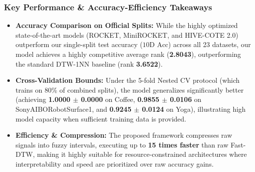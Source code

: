 \documentclass[conference]{IEEEtran}
\begin{document}
\subsubsection{Key Performance \& Accuracy-Efficiency Takeaways}
\begin{itemize}
    \item \textbf{Accuracy Comparison on Official Splits:} While the highly optimized state-of-the-art models (ROCKET, MiniROCKET, and HIVE-COTE 2.0) outperform our single-split test accuracy ($10\text{D Acc}$) across all 23 datasets, our model achieves a highly competitive average rank (\textbf{2.8043}), outperforming the standard DTW-1NN baseline (rank \textbf{3.6522}).
    \item \textbf{Cross-Validation Bounds:} Under the 5-fold Nested CV protocol (which trains on 80\% of combined splits), the model generalizes significantly better (achieving \textbf{1.0000 $\pm$ 0.0000} on Coffee, \textbf{0.9855 $\pm$ 0.0106} on SonyAIBORobotSurface1, and \textbf{0.9245 $\pm$ 0.0124} on Yoga), illustrating high model capacity when sufficient training data is provided.
    \item \textbf{Efficiency \& Compression:} The proposed framework compresses raw signals into fuzzy intervals, executing up to \textbf{15 times faster} than raw Fast-DTW, making it highly suitable for resource-constrained architectures where interpretability and speed are prioritized over raw accuracy gains.
\end{itemize}
\end{document}
